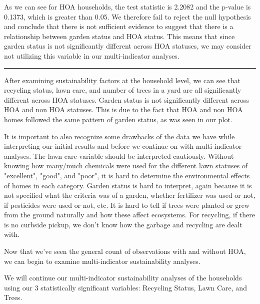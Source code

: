 \documentclass{article}
\begin{document}
As we can see for HOA households, the test statistic is 2.2082 and the p-value is 0.1373, which is greater than 0.05. We therefore fail to reject the null hypothesis and conclude that there is not sufficient evidence to suggest that there is a relationship between garden status and HOA status. This means that since garden status is not significantly different across HOA statuses, we may consider not utilizing this variable in our multi-indicator analyses.

\newpage
\noindent\rule{16cm}{0.4pt}
\newline
After examining sustainability factors at the household level, we can see that recycling status, lawn care, and number of trees in a yard are all significantly different across HOA statuses. Garden status is not significantly different across HOA and non HOA statuses. This is due to the fact that HOA and non HOA homes followed the same pattern of garden status, as was seen in our plot. 

It is important to also recognize some drawbacks of the data we have while interpreting our initial results and before we continue on with multi-indicator analyses. The lawn care variable should be interpreted cautiously. Without knowing how many/much chemicals were used for the different lawn statuses of "excellent", "good", and "poor", it is hard to determine the environmental effects of homes in each category. Garden status is hard to interpret, again because it is not specified what the criteria was of a garden, whether fertilizer was used or not, if pesticides were used or not, etc. It is hard to tell if trees were planted or grew from the ground naturally and how these affect ecosystems. For recycling, if there is no curbside pickup, we don't know how the garbage and recycling are dealt with. 

Now that we've seen the general count of observations with and without HOA, we can begin to examine multi-indicator sustainability analyses.




We will continue our multi-indicator sustainability analyses of the households using our 3 statistically significant variables: Recycling Status, Lawn Care, and Trees.
\end{document}
